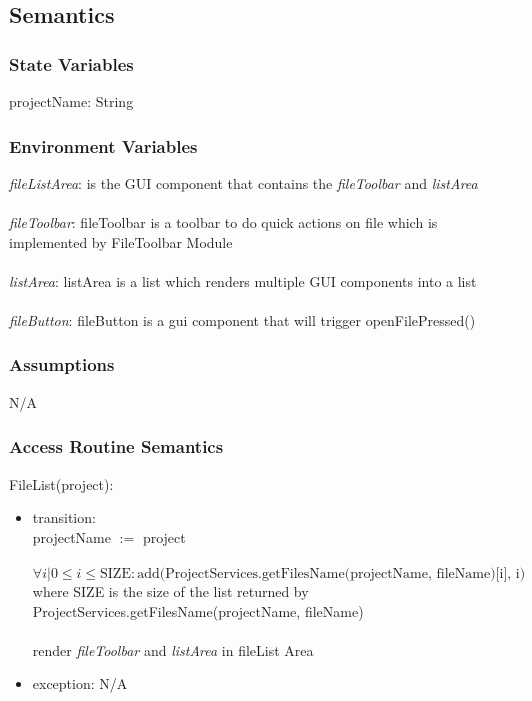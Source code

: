 \documentclass[12pt, titlepage]{article}
\begin{document}
	\subsection{Semantics}
	
	\subsubsection{State Variables}
	
	projectName: String
	
	\subsubsection{Environment Variables}
	
	\textit{fileListArea}: is the GUI component that contains the \textit{fileToolbar} and \textit{listArea}\\\\
	\textit{fileToolbar}: fileToolbar is a toolbar to do quick actions on file which is implemented by FileToolbar Module\\\\
	\textit{listArea}: listArea is a list which renders multiple GUI components into a list\\\\
	\textit{fileButton}: fileButton is a gui component that will trigger openFilePressed()
	
	\subsubsection{Assumptions}
	N/A
	
	\subsubsection{Access Routine Semantics}
	
	\noindent FileList(project):
	\begin{itemize}
		\item transition: \\
		projectName $:=$ project \\\\
		$\forall i | 0 \leq i \leq \text{SIZE}: \text{add(ProjectServices.getFilesName(projectName, fileName)[i], i)}$ where SIZE is the size of the list returned by ProjectServices.getFilesName(projectName, fileName) \\\\
		render \textit{fileToolbar} and \textit{listArea} in fileList Area
		\item exception: N/A
	\end{itemize}
	
\end{document}

